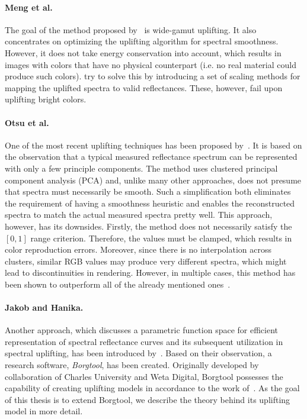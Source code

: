 \paragraph{Meng et al.} The goal of the method proposed by~\citet{upsamplingMeng} is wide-gamut uplifting. It also concentrates on optimizing the uplifting algorithm for spectral smoothness. However, it does not take energy conservation into account, which results in images with colors that have no physical counterpart (i.e. no real material could produce such colors). \citet{upsamplingMeng} try to solve this by introducing a set of scaling methods for mapping the uplifted spectra to valid reflectances. These, however, fail upon uplifting bright colors. 

\paragraph{Otsu et al.} One of the most recent uplifting techniques has been proposed by~\citet{upsamplingOtsu}. It is based on the observation that a typical measured reflectance spectrum can be represented with only a few principle components. The method uses clustered principal component analysis (PCA) and, unlike many other approaches, does not presume that spectra must necessarily be smooth. Such a simplification both eliminates the requirement of having a smoothness heuristic and enables the reconstructed spectra to match the actual measured spectra pretty well. This approach, however, has its downsides. Firstly, the method does not necessarily satisfy the $[0,1]$ range criterion. Therefore, the values must be clamped, which results in color reproduction errors. Moreover, since there is no interpolation across clusters, similar RGB values may produce very different spectra, which might lead to discontinuities in rendering. However, in multiple cases, this method has been shown to outperform all of the already mentioned ones~\cite{upsamplingJakobHanika}.

\paragraph{Jakob and Hanika.} Another approach, which discusses a parametric function space for efficient representation of spectral reflectance curves and its subsequent utilization in spectral uplifting, has been introduced by~\citet{upsamplingJakobHanika}. Based on their observation, a research software, \emph{Borgtool}, has been created. Originally developed by collaboration of Charles University and Weta Digital, Borgtool possesses the capability of creating uplifting models in accordance to the work of~\citet{upsamplingJakobHanika}. As the goal of this thesis is to extend Borgtool, we describe the theory behind its uplifting model in more detail.

